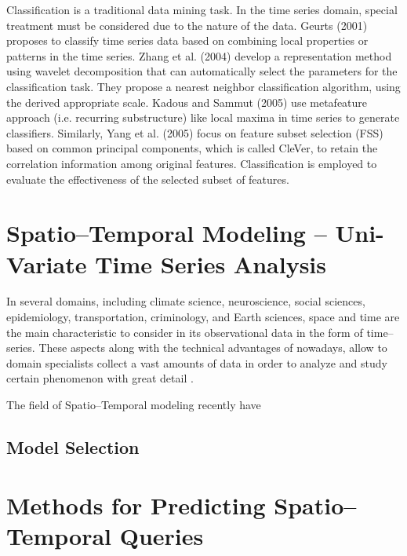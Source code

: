 

Classification is a traditional data mining task. In the time series domain, special treatment must be considered due to the nature of the data. Geurts (2001) proposes to classify time series data based on combining local properties or patterns in the time series. Zhang et al. (2004) develop a representation method using wavelet decomposition that can automatically select the parameters for the classification task. They propose a nearest neighbor classification algorithm, using the derived appropriate scale. Kadous and Sammut (2005) use metafeature approach (i.e. recurring substructure) like local maxima in time series to generate classifiers. Similarly, Yang et al. (2005) focus on feature subset selection (FSS) based on common principal components, which is called CleVer, to retain the correlation information among original features. Classification is employed to evaluate the effectiveness of the selected subset of features. 





\section{Spatio--Temporal Modeling -- Uni-Variate Time Series Analysis}
\label{Sec:STModeling}

In several domains, including climate science, neuroscience, social sciences, epidemiology, transportation, criminology, and Earth sciences, space and time are the main characteristic to consider in its observational data in the form of time--series. These aspects along with the technical advantages of nowadays, allow to domain specialists collect a vast amounts of data in order to analyze and study certain phenomenon with great detail \cite{}. 

The field of Spatio--Temporal modeling recently have 

\subsection{Model Selection}



\section{Methods for Predicting Spatio--Temporal Queries}
\label{Sec:RelatedWorksQueries}

